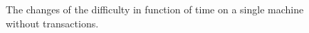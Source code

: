 \begin{figure}
\begin{center}
	\caption{The changes of the difficulty in function of time on 
	a single machine without transactions.}
	\label{fig:start_difficulty}
	
	\end{center}
\end{figure}





